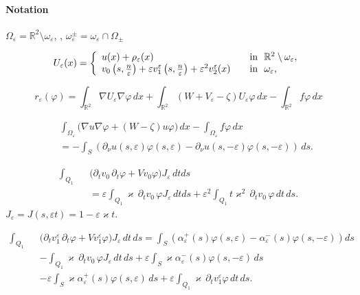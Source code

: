 \documentclass[graybox]{svmult}
\renewcommand{\kappa}{\varkappa}
\newcommand{\Real}{\mathbb R}
\newcommand{\eps}{\varepsilon}
\renewcommand{\phi}{\varphi}
\newcommand\nep{\textstyle\frac n\eps}
\begin{document}
\paragraph{Notation}

$\Omega_\eps=\Real^2\setminus\omega_\eps$, , $\omega_\eps^\pm=\omega_\eps\cap \Omega_\pm$

\begin{equation}\label{AsymptoticsUe}
U_\eps(x)=
\left\{
  \begin{array}{ll}
    u(x)+\rho_\eps(x)&\quad \hbox{in \ }\Real^2\setminus \omega_\eps, \\
    v_0\left(s,\nep\right)+\eps v_1^\eps\left(s,\nep\right)+\eps^2 v_2^\eps(x)
&\quad \hbox{in \ } \omega_\eps,
  \end{array}
\right.
\end{equation}







$$
r_\eps(\phi)=\int_{\Real^2}\nabla U_\eps \nabla \phi\,dx+
             \int_{\Real^2} (W+V_\eps-\zeta)U_\eps \phi\,dx
            -   \int_{\Real^2}f\phi\,dx
$$


\begin{eqnarray}\nonumber
&&\int_{\Omega_\eps}\big(\nabla u \nabla \phi+(W-\zeta)u\phi \big)\,dx-\int_{\Omega_\eps}f\phi\,dx\\\nonumber
&&=-\int_S (\partial_\nu u(s,\eps)\phi(s,\eps)-\partial_\nu u(s,-\eps)\phi(s,-\eps) )\,ds.
\end{eqnarray}



\begin{eqnarray}\nonumber
\int_{Q_1}&&\big(\partial_t v_0 \,\partial_t \phi
+Vv_0 \phi\big)J_\eps\,dt ds\\
&&=\eps \int_{Q_1} \kappa\,\partial_t v_0\, \phi J_\eps\,dt ds+\eps^2\int_{Q_1} t\kappa^2\,\partial_t v_0 \,\phi \,dt \,ds.
\end{eqnarray}
$J_\eps=J(s,\eps t)=1-\eps\kappa t$.

\begin{eqnarray}\nonumber
\int_{Q_1}&&\big(\partial_t v_1^\eps \,\partial_t \phi
+Vv_1^\eps \phi\big)J_\eps\,dt\, ds=\int_S\left(\alpha_\eps^+(s)\phi(s,\eps)-\alpha_\eps^-(s)\phi(s,-\eps)\right)ds\\\nonumber
&&-
\int_{Q_1}\kappa \,\partial_t v_0\, \phi J_\eps\,dt\, ds
+\eps \int_S \kappa\alpha_\eps^-(s)\phi(s,-\eps)\,ds
\\\nonumber
&&-
\eps \int_S \kappa\alpha_\eps^+(s)\phi(s,\eps)\,ds
+\eps\int_{Q_1}\kappa \,\partial_t v_1^\eps \phi\,dt\, ds.
\end{eqnarray}
\end{document}
